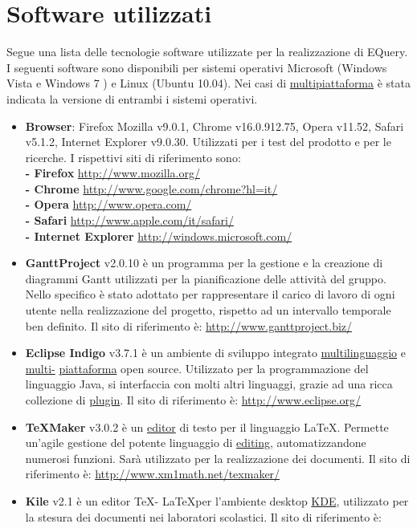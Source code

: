\documentclass[a4paper,11pt]{article}
\begin{document}
\section{Software utilizzati}
Segue una lista delle tecnologie software utilizzate per la realizzazione di EQuery. I seguenti software sono disponibili per sistemi operativi Microsoft (Windows Vista e Windows 7 ) e Linux (Ubuntu 10.04). Nei casi di \underline{multipiattaforma} \`e stata indicata la versione di entrambi i sistemi operativi.
\begin{itemize}
\item \textbf{Browser}: Firefox Mozilla v9.0.1, Chrome v16.0.912.75, Opera v11.52, Safari v5.1.2, Internet Explorer v9.0.30. Utilizzati per i test del prodotto e per le ricerche. I rispettivi siti di riferimento sono: \\
\textbf{-  Firefox} \url{http://www.mozilla.org/}\\
\textbf{-  Chrome} \url{http://www.google.com/chrome?hl=it/}\\
\textbf{-  Opera} \url{http://www.opera.com/} \\
\textbf{-  Safari} \url{http://www.apple.com/it/safari/}\\
\textbf{-  Internet Explorer} \url{http://windows.microsoft.com/}
\item \textbf{GanttProject} v2.0.10 \`e un programma per la gestione e la creazione di diagrammi Gantt utilizzati per la pianificazione delle attivit\`a del gruppo. Nello specifico \`e stato adottato per rappresentare il carico di lavoro di ogni utente nella realizzazione del progetto, rispetto ad un intervallo temporale ben definito. Il sito di riferimento \`e: \url{http://www.ganttproject.biz/}
\item \textbf{Eclipse Indigo} v3.7.1 \`e un ambiente di sviluppo integrato \underline{multilinguaggio} e \underline{multi-} \underline{piattaforma} open source. Utilizzato per la programmazione del linguaggio Java, si interfaccia con molti altri linguaggi, grazie ad una ricca collezione di \underline{plugin}. Il sito di riferimento \`e: \url{http://www.eclipse.org/}
\item \textbf{\TeX Maker} v3.0.2 \`e un \underline{editor} di testo per il linguaggio \LaTeX. Permette un'agile gestione del potente linguaggio di \underline{editing}, automatizzandone numerosi funzioni. Sar\`a utilizzato per la realizzazione dei documenti. Il sito di riferimento \`e: \url{http://www.xm1math.net/texmaker/}
\item \textbf{Kile} v2.1 \`e un editor \TeX - \LaTeX per l'ambiente desktop \underline{KDE}, utilizzato per la stesura dei documenti nei laboratori scolastici. Il sito di riferimento \`e:

\end{itemize}
\end{document}
